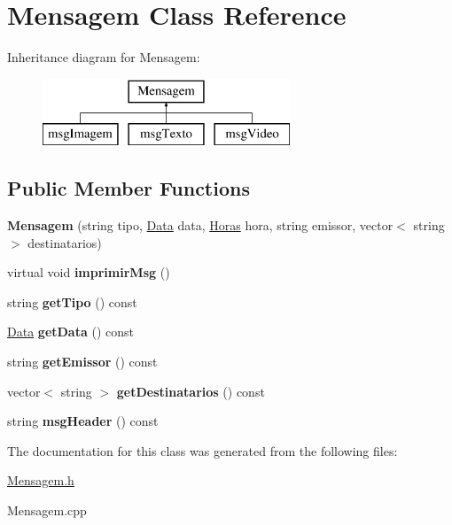 \hypertarget{class_mensagem}{}\section{Mensagem Class Reference}
\label{class_mensagem}
Inheritance diagram for Mensagem\+:\begin{figure}[H]
\begin{center}
\leavevmode
\includegraphics[height=2.000000cm]{class_mensagem}
\end{center}
\end{figure}
\subsection*{Public Member Functions}
\begin{DoxyCompactItemize}
\item 
\hypertarget{class_mensagem_a9cf63e7a97a5332db5f224880c88c384}{}{\bfseries Mensagem} (string tipo, \hyperlink{class_data}{Data} data, \hyperlink{class_horas}{Horas} hora, string emissor, vector$<$ string $>$ destinatarios)\label{class_mensagem_a9cf63e7a97a5332db5f224880c88c384}

\item 
\hypertarget{class_mensagem_a4490a1cfe88288fa1ff4b41327e769ed}{}virtual void {\bfseries imprimir\+Msg} ()\label{class_mensagem_a4490a1cfe88288fa1ff4b41327e769ed}

\item 
\hypertarget{class_mensagem_a8bc741656cce63923a56d9498e371a54}{}string {\bfseries get\+Tipo} () const \label{class_mensagem_a8bc741656cce63923a56d9498e371a54}

\item 
\hypertarget{class_mensagem_a8d3b52e1c20fac96c4df60c79b5b7846}{}\hyperlink{class_data}{Data} {\bfseries get\+Data} () const \label{class_mensagem_a8d3b52e1c20fac96c4df60c79b5b7846}

\item 
\hypertarget{class_mensagem_a5438dfe93aec2e6512042704e134d5db}{}string {\bfseries get\+Emissor} () const \label{class_mensagem_a5438dfe93aec2e6512042704e134d5db}

\item 
\hypertarget{class_mensagem_a592c17de121d1549aee4f9bb8a02d8b7}{}vector$<$ string $>$ {\bfseries get\+Destinatarios} () const \label{class_mensagem_a592c17de121d1549aee4f9bb8a02d8b7}

\item 
\hypertarget{class_mensagem_aa4cf61d603448660470ac889ebe58b71}{}string {\bfseries msg\+Header} () const \label{class_mensagem_aa4cf61d603448660470ac889ebe58b71}

\end{DoxyCompactItemize}


The documentation for this class was generated from the following files\+:\begin{DoxyCompactItemize}
\item 
\hyperlink{_mensagem_8h}{Mensagem.\+h}\item 
Mensagem.\+cpp\end{DoxyCompactItemize}
